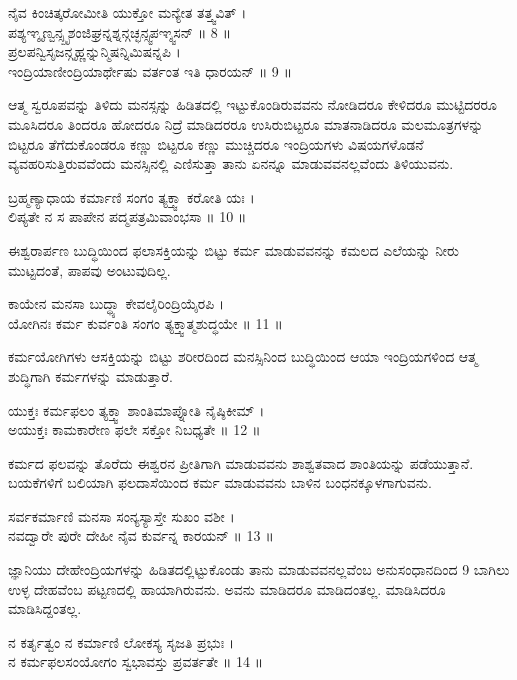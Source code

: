 ನೈವ ಕಿಂಚಿತ್ಕರೋಮೀತಿ ಯುಕ್ತೋ ಮನ್ಯೇತ ತತ್ತ್ವವಿತ್ ।\\
ಪಶ್ಯಞ್ಶೃಣ್ವನ್ಸ್ಪೃಶಂಜಿಘ್ರನ್ನಶ್ನನ್ಗಚ್ಛನ್ಸ್ವಪಞ್ಶ್ವಸನ್ ॥ 8 ॥\\
ಪ್ರಲಪನ್ವಿಸೃಜನ್ಗೃಹ್ಣನ್ನುನ್ಮಿಷನ್ನಿಮಿಷನ್ನಪಿ ।\\
ಇಂದ್ರಿಯಾಣೀಂದ್ರಿಯಾರ್ಥೇಷು ವರ್ತಂತ ಇತಿ ಧಾರಯನ್ ॥ 9 ॥
\begin{quoting}
ಆತ್ಮ ಸ್ವರೂಪವನ್ನು ತಿಳಿದು ಮನಸ್ಸನ್ನು ಹಿಡಿತದಲ್ಲಿ ಇಟ್ಟುಕೊಂಡಿರುವವನು ನೋಡಿದರೂ ಕೇಳಿದರೂ ಮುಟ್ಟಿದರರೂ ಮೂಸಿದರೂ ತಿಂದರೂ ಹೋದರೂ ನಿದ್ರೆ ಮಾಡಿದರರೂ ಉಸಿರುಬಿಟ್ಟರೂ ಮಾತನಾಡಿದರೂ ಮಲಮೂತ್ರಗಳನ್ನು ಬಿಟ್ಟರೂ ತೆಗೆದುಕೊಂಡರೂ ಕಣ್ಣು ಬಿಟ್ಟರೂ ಕಣ್ಣು ಮುಚ್ಚಿದರೂ ಇಂದ್ರಿಯಗಳು ವಿಷಯಗಳೊಡನೆ ವ್ಯವಹರಿಸುತ್ತಿರುವವೆಂದು ಮನಸ್ಸಿನಲ್ಲಿ ಎಣಿಸುತ್ತಾ ತಾನು ಏನನ್ನೂ ಮಾಡುವವನಲ್ಲವೆಂದು ತಿಳಿಯುವನು.\\
\end{quoting}
ಬ್ರಹ್ಮಣ್ಯಾಧಾಯ ಕರ್ಮಾಣಿ ಸಂಗಂ ತ್ಯಕ್ತ್ವಾ ಕರೋತಿ ಯಃ ।\\
ಲಿಪ್ಯತೇ ನ ಸ ಪಾಪೇನ ಪದ್ಮಪತ್ರಮಿವಾಂಭಸಾ ॥ 10 ॥
\begin{quoting}
ಈಶ್ವರಾರ್ಪಣ ಬುದ್ಧಿಯಿಂದ ಫಲಾಸಕ್ತಿಯನ್ನು ಬಿಟ್ಟು ಕರ್ಮ ಮಾಡುವವನನ್ನು ಕಮಲದ ಎಲೆಯನ್ನು ನೀರು  ಮುಟ್ಟದಂತೆ, ಪಾಪವು ಅಂಟುವುದಿಲ್ಲ.\\
\end{quoting}
ಕಾಯೇನ ಮನಸಾ ಬುದ್ಧ್ಯಾ ಕೇವಲೈರಿಂದ್ರಿಯೈರಪಿ ।\\
ಯೋಗಿನಃ ಕರ್ಮ ಕುರ್ವಂತಿ ಸಂಗಂ ತ್ಯಕ್ತ್ವಾತ್ಮಶುದ್ಧಯೇ ॥ 11 ॥
\begin{quoting}
ಕರ್ಮಯೋಗಿಗಳು ಆಸಕ್ತಿಯನ್ನು ಬಿಟ್ಟು ಶರೀರದಿಂದ ಮನಸ್ಸಿನಿಂದ ಬುದ್ಧಿಯಿಂದ ಆಯಾ ಇಂದ್ರಿಯಗಳಿಂದ ಆತ್ಮ ಶುದ್ಧಿಗಾಗಿ ಕರ್ಮಗಳನ್ನು ಮಾಡುತ್ತಾರೆ.\\
\end{quoting}
ಯುಕ್ತಃ ಕರ್ಮಫಲಂ ತ್ಯಕ್ತ್ವಾ ಶಾಂತಿಮಾಪ್ನೋತಿ ನೈಷ್ಠಿಕೀಮ್ ।\\
ಅಯುಕ್ತಃ ಕಾಮಕಾರೇಣ ಫಲೇ ಸಕ್ತೋ ನಿಬಧ್ಯತೇ ॥ 12 ॥
\begin{quoting}
ಕರ್ಮದ ಫಲವನ್ನು ತೊರೆದು ಈಶ್ವರನ ಪ್ರೀತಿಗಾಗಿ ಮಾಡುವವನು ಶಾಶ್ವತವಾದ ಶಾಂತಿಯನ್ನು ಪಡೆಯುತ್ತಾನೆ. ಬಯಕೆಗಳಿಗೆ ಬಲಿಯಾಗಿ ಫಲದಾಸೆಯಿಂದ ಕರ್ಮ ಮಾಡುವವನು ಬಾಳಿನ ಬಂಧನಕ್ಕೂಳಗಾಗುವನು.\\
\end{quoting}
ಸರ್ವಕರ್ಮಾಣಿ ಮನಸಾ ಸಂನ್ಯಸ್ಯಾಸ್ತೇ ಸುಖಂ ವಶೀ ।\\
ನವದ್ವಾರೇ ಪುರೇ ದೇಹೀ ನೈವ ಕುರ್ವನ್ನ ಕಾರಯನ್ ॥ 13 ॥
\begin{quoting}
ಜ್ಞಾನಿಯು ದೇಹೇಂದ್ರಿಯಗಳನ್ನು ಹಿಡಿತದಲ್ಲಿಟ್ಟುಕೊಂಡು ತಾನು ಮಾಡುವವನಲ್ಲವೆಂಬ ಅನುಸಂಧಾನದಿಂದ 9 ಬಾಗಿಲು ಉಳ್ಳ ದೇಹವೆಂಬ ಪಟ್ಟಣದಲ್ಲಿ ಹಾಯಾಗಿರುವನು. ಅವನು ಮಾಡಿದರೂ ಮಾಡಿದಂತಲ್ಲ. ಮಾಡಿಸಿದರೂ ಮಾಡಿಸಿದ್ದಂತಲ್ಲ.\\
\end{quoting}
ನ ಕರ್ತೃತ್ವಂ ನ ಕರ್ಮಾಣಿ ಲೋಕಸ್ಯ ಸೃಜತಿ ಪ್ರಭುಃ ।\\
ನ ಕರ್ಮಫಲಸಂಯೋಗಂ ಸ್ವಭಾವಸ್ತು ಪ್ರವರ್ತತೇ ॥ 14 ॥
